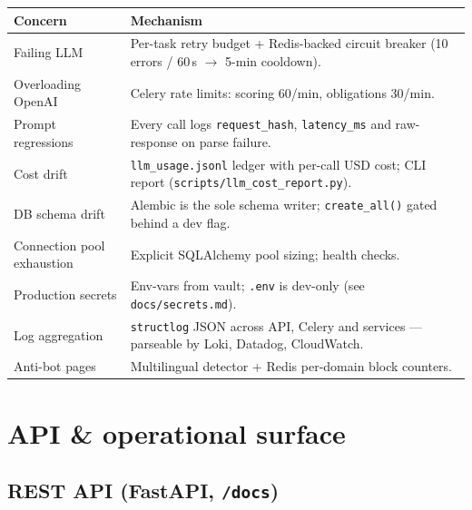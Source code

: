 \documentclass[11pt,a4paper]{article}
\begin{document}
\begin{center}
\small
\begin{tabularx}{\linewidth}{@{}lX@{}}
\toprule
\textbf{Concern} & \textbf{Mechanism} \\
\midrule
Failing LLM        & Per-task retry budget + Redis-backed circuit breaker (10 errors / 60\,s $\to$ 5-min cooldown). \\
Overloading OpenAI & Celery rate limits: scoring 60/min, obligations 30/min. \\
Prompt regressions & Every call logs \texttt{request\_hash}, \texttt{latency\_ms} and raw-response on parse failure. \\
Cost drift         & \texttt{llm\_usage.jsonl} ledger with per-call USD cost; CLI report (\texttt{scripts/llm\_cost\_report.py}). \\
DB schema drift    & Alembic is the sole schema writer; \texttt{create\_all()} gated behind a dev flag. \\
Connection pool exhaustion & Explicit SQLAlchemy pool sizing; health checks. \\
Production secrets & Env-vars from vault; \texttt{.env} is dev-only (see \texttt{docs/secrets.md}). \\
Log aggregation    & \texttt{structlog} JSON across API, Celery and services ---{} parseable by Loki, Datadog, CloudWatch. \\
Anti-bot pages     & Multilingual detector + Redis per-domain block counters. \\
\bottomrule
\end{tabularx}
\end{center}

\section{API \& operational surface}

\subsection{REST API (FastAPI, \texttt{/docs})}
\end{document}
